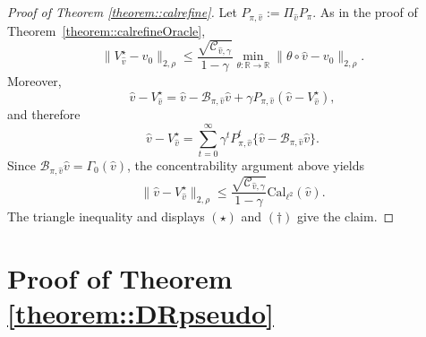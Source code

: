 \documentclass{article}
\theoremstyle{plain}
\theoremstyle{definition}
\theoremstyle{remark}
\begin{document}
\begin{proof}[Proof of Theorem \ref{theorem::calrefine}]
Let \(P_{\pi,\hat v} := \Pi_{\hat v}P_{\pi}\).
As in the proof of Theorem~\ref{theorem::calrefineOracle},
\[
\|V_{\hat v}^\star-v_0\|_{2,\rho}
\le
\frac{\sqrt{\mathcal C_{\hat v,\gamma}}}{1-\gamma}
\min_{\theta:\mathbb R\to\mathbb R}
\|\theta\circ\hat v-v_0\|_{2,\rho}.
\tag{$\star$}
\]
Moreover,
\[
\hat v - V_{\hat v}^\star
=
\hat v-\mathcal B_{\pi,\hat v}\hat v
+
\gamma P_{\pi,\hat v}(\hat v-V_{\hat v}^\star),
\]
and therefore
\[
\hat v - V_{\hat v}^\star
=
\sum_{t=0}^\infty \gamma^t
P_{\pi,\hat v}^t
\{\hat v-\mathcal B_{\pi,\hat v}\hat v\}.
\]
Since \(\mathcal B_{\pi,\hat v}\hat v=\Gamma_0(\hat v)\), the
concentrability argument above yields
\[
\|\hat v - V_{\hat v}^\star\|_{2,\rho}
\le
\frac{\sqrt{\mathcal C_{\hat v,\gamma}}}{1-\gamma}
\mathrm{Cal}_{\ell^2}(\hat v).
\tag{$\dagger$}
\]
The triangle inequality and displays \((\star)\) and \((\dagger)\) give the
claim.
\end{proof}



\section{Proof of Theorem \ref{theorem::DRpseudo}}
\end{document}
